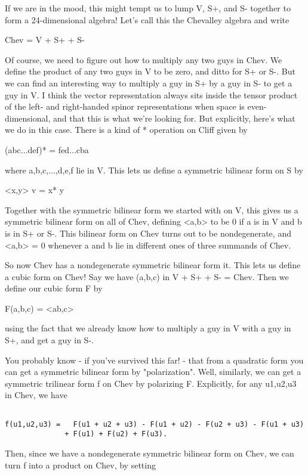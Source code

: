 If we are in the mood, this might tempt us to lump V, S+, and S- together to
form a 24-dimensional algebra!  Let's call this the Chevalley algebra
and write 

Chev = V + S+ + S-

Of course, we need to figure out how to multiply any two guys in Chev.
We define the product of any two guys in V to be zero, and ditto for
S+ or S-.  But we can find an interesting way to multiply a guy in S+
by a guy in S- to get a guy in V.  I think the vector representation
always sits inside the tensor product of the left- and right-handed
spinor representations when space is even-dimensional, and that
this is what we're looking for.  But explicitly, here's what we do 
in this case.  There is a kind of * operation on Cliff given 
by 

(abc...def)* = fed...cba

where a,b,c,...,d,e,f lie in V.  This lets us define a symmetric
bilinear form on S by

<x,y> v = x* y

Together with the symmetric bilinear form we started with on V,
this gives us a symmetric bilinear form on all of Chev, defining
<a,b> to be 0 if a is in V and b is in S+ or S-.  This bilinear form
on Chev turns out to be nondegenerate, and <a,b> = 0 whenever a and
b lie in different ones of three summands of Chev.  

So now Chev has a nondegenerate symmetric bilinear form it.  This lets
us define a cubic form on Chev!  Say we have (a,b,c) in V + S+ + S- =
Chev.  Then we define our cubic form F by

F(a,b,c) = <ab,c>

using the fact that we already know how to multiply a guy in V with
a guy in S+, and get a guy in S-.  

You probably know - if you've survived this far! - that from a 
quadratic form you can get a symmetric bilinear form by "polarization".  
Well, similarly, we can get a symmetric trilinear form f on Chev by
polarizing F.  Explicitly, for any u1,u2,u3 in Chev, we have


\begin{verbatim}

f(u1,u2,u3) =   F(u1 + u2 + u3) - F(u1 + u2) - F(u2 + u3) - F(u1 + u3)
              + F(u1) + F(u2) + F(u3).
\end{verbatim}
    

Then, since we have a nondegenerate symmetric bilinear form on Chev, we
can turn f into a product on Chev, by setting

